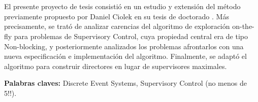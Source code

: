 \chapter*{\runtitulo}

\noindent 
El presente proyecto de tesis consistió en un estudio y extensión del método previamente propuesto por Daniel Ciolek en su tesis de doctorado \cite{tesisDani}. Más precisamente, se trató de analizar carencias del algoritmo de exploración on-the-fly para problemas de Supervisory Control, cuya propiedad central era de tipo Non-blocking, y posteriormente analizados los problemas afrontarlos con una nueva especificación e implementación del algoritmo. Finalmente, se adaptó el algoritmo para construir directores en lugar de supervisores maximales.

\bigskip

\noindent\textbf{Palabras claves:} Discrete Event Systems, Supervisory Control (no menos de 5!!).